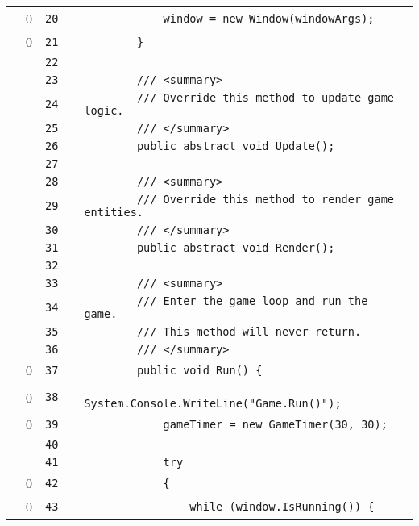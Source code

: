 \documentclass[a4paper,landscape,10pt]{article}
\begin{document}
\begin{longtable}[l]{lrrll}
\cellcolor{red} & 0 & \verb~20~ & & \verb~            window = new Window(windowArgs);~\\
\cellcolor{red} & 0 & \verb~21~ & & \verb~        }~\\
\cellcolor{gray} &  & \verb~22~ & & \verb~~\\
\cellcolor{gray} &  & \verb~23~ & & \verb~        /// <summary>~\\
\cellcolor{gray} &  & \verb~24~ & & \verb~        /// Override this method to update game logic.~\\
\cellcolor{gray} &  & \verb~25~ & & \verb~        /// </summary>~\\
\cellcolor{gray} &  & \verb~26~ & & \verb~        public abstract void Update();~\\
\cellcolor{gray} &  & \verb~27~ & & \verb~~\\
\cellcolor{gray} &  & \verb~28~ & & \verb~        /// <summary>~\\
\cellcolor{gray} &  & \verb~29~ & & \verb~        /// Override this method to render game entities.~\\
\cellcolor{gray} &  & \verb~30~ & & \verb~        /// </summary>~\\
\cellcolor{gray} &  & \verb~31~ & & \verb~        public abstract void Render();~\\
\cellcolor{gray} &  & \verb~32~ & & \verb~~\\
\cellcolor{gray} &  & \verb~33~ & & \verb~        /// <summary>~\\
\cellcolor{gray} &  & \verb~34~ & & \verb~        /// Enter the game loop and run the game.~\\
\cellcolor{gray} &  & \verb~35~ & & \verb~        /// This method will never return.~\\
\cellcolor{gray} &  & \verb~36~ & & \verb~        /// </summary>~\\
\cellcolor{red} & 0 & \verb~37~ & & \verb~        public void Run() {~\\
\cellcolor{red} & 0 & \verb~38~ & & \verb~            System.Console.WriteLine("Game.Run()");~\\
\cellcolor{red} & 0 & \verb~39~ & & \verb~            gameTimer = new GameTimer(30, 30);~\\
\cellcolor{gray} &  & \verb~40~ & & \verb~~\\
\cellcolor{gray} &  & \verb~41~ & & \verb~            try~\\
\cellcolor{red} & 0 & \verb~42~ & & \verb~            {~\\
\cellcolor{red} & 0 & \verb~43~ & & \verb~                while (window.IsRunning()) {~\\

\end{longtable}
\end{document}
